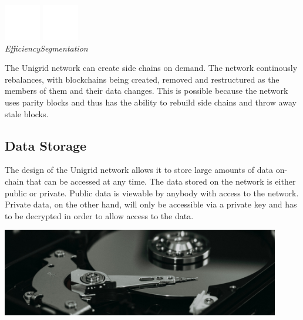 \documentclass{article}
\begin{document}
\begin{center}
\vspace{0.1cm}
\includegraphics[width=45pt]{efficiency}
\hspace{1.5cm}
\includegraphics[width=45pt]{segmented}
\\
\vspace{0.1cm}
\hspace{10pt}\emph{Efficiency}\hspace{46pt}\emph{Segmentation}
\end{center}

\noindent The Unigrid network can create side chains on demand. The network continously rebalances, with blockchains being created, removed and restructured as the members of them and their data changes. This is possible because the network uses parity blocks and thus has the ability to rebuild side chains and throw away stale blocks.

\subsection{Data Storage}
The design of the Unigrid network allows it to store large amounts of data on-chain that can be accessed at any time. The data stored on the network is either public or private. Public data is viewable by anybody with access to the network. Private data, on the other hand, will only be accessible via a private key and has to be decrypted in order to allow access to the data.

\begin{mdframed}[style=textimage]
	\includegraphics[width=345pt]{hard-drive}
\end{mdframed}
\end{document}
